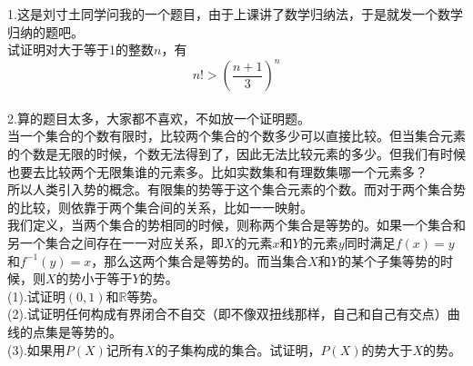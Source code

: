 \documentclass[11pt,a4paper,openany]{article}
\begin{document}
\noindent 1.这是刘寸土同学问我的一个题目，由于上课讲了数学归纳法，于是就发一个数学归纳的题吧。\\
\indent 试证明对大于等于1的整数$n$，有
\[
n!>\left(\frac{n+1}{3}\right)^n
\]
\\
2.算的题目太多，大家都不喜欢，不如放一个证明题。\\
\indent 当一个集合的个数有限时，比较两个集合的个数多少可以直接比较。但当集合元素的个数是无限的时候，个数无法得到了，因此无法比较元素的多少。但我们有时候也要去比较两个无限集谁的元素多。比如实数集和有理数集哪一个元素多？\\
\indent 所以人类引入势的概念。有限集的势等于这个集合元素的个数。而对于两个集合势的比较，则依靠于两个集合间的关系，比如一一映射。\\
\indent 我们定义，当两个集合的势相同的时候，则称两个集合是等势的。如果一个集合和另一个集合之间存在一一对应关系，即$X$的元素$x$和$Y$的元素$y$同时满足$f(x)=y$和$f^{-1}(y)=x$，那么这两个集合是等势的。而当集合$X$和$Y$的某个子集等势的时候，则$X$的势小于等于$Y$的势。\\
\indent (1).试证明$(0,1)$和$\mathbb{R}$等势。\\
\indent (2).试证明任何构成有界闭合不自交（即不像双扭线那样，自己和自己有交点）曲线的点集是等势的。\\
\indent (3).如果用$P(X)$记所有$X$的子集构成的集合。试证明，$P(X)$的势大于$X$的势。
\newpage
\end{document}
